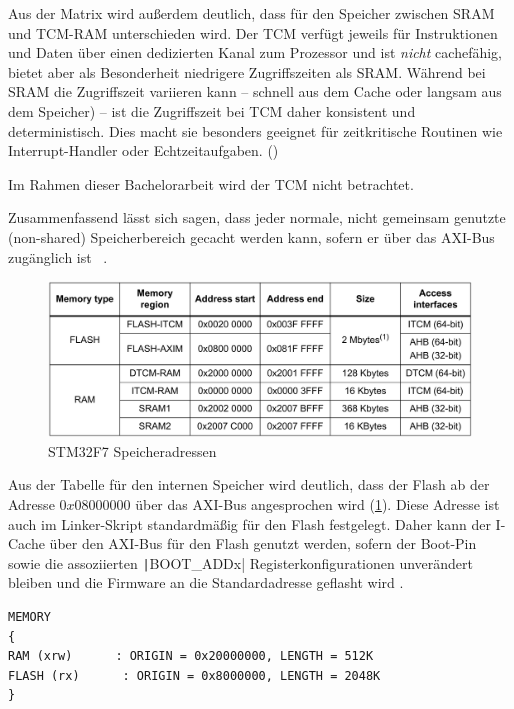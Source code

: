 Aus der Matrix wird außerdem deutlich, dass für den Speicher zwischen SRAM und
TCM-RAM unterschieden wird. Der \ac{TCM} verfügt jeweils für Instruktionen und
Daten über einen dedizierten Kanal zum Prozessor und ist \textit{nicht}
cachefähig, bietet aber als Besonderheit niedrigere Zugriffszeiten als SRAM.
Während bei SRAM die Zugriffszeit variieren kann -- schnell aus dem Cache oder
langsam aus dem Speicher) -- ist die Zugriffszeit bei TCM daher konsistent und
deterministisch. Dies macht sie besonders geeignet für zeitkritische Routinen
wie Interrupt-Handler oder Echtzeitaufgaben. (\cite{arm_den0042})

Im Rahmen dieser Bachelorarbeit wird der TCM nicht betrachtet.

Zusammenfassend lässt sich sagen, dass jeder normale, nicht gemeinsam genutzte
(non-shared) Speicherbereich gecacht werden kann, sofern er über das AXI-Bus
zugänglich ist \cite[S. 4]{an4839}~\cite[S. 7]{an4667}.

\begin{figure}[htb]
    \centering
    \includegraphics[width=1\textwidth]{assets/internal_mem_table}
    \caption{STM32F7 Speicheradressen \cite[S. 14]{an4667}}
    \label{fig:internal_mem_table}
\end{figure}

Aus der Tabelle für den internen Speicher wird deutlich, dass der Flash ab der
Adresse $0x0800 0000$ über das AXI-Bus angesprochen wird
(\ref{fig:internal_mem_table}). Diese Adresse ist auch im Linker-Skript
standardmäßig für den Flash festgelegt. Daher kann der I-Cache über den AXI-Bus
für den Flash genutzt werden, sofern der Boot-Pin sowie die assoziierten
\texttt|BOOT_ADDx| Registerkonfigurationen unverändert bleiben und die
Firmware an die Standardadresse geflasht wird \cite[S. 28]{stm32_datasheet}.

\begin{code}
\begin{verbatim}
MEMORY
{
RAM (xrw)      : ORIGIN = 0x20000000, LENGTH = 512K
FLASH (rx)      : ORIGIN = 0x8000000, LENGTH = 2048K
}
\end{verbatim}
\end{code}

